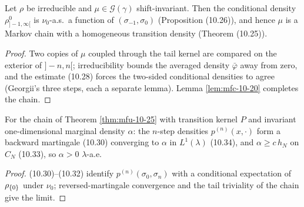 \begin{theorem}[Georgii (10.25)--(10.26)]
    \label{thm:mfu-10-25}
    \leanok

    Let $\rho$ be irreducible and $\mu \in \mathcal G(\gamma)$ shift-invariant. Then the
    conditional density $\rho^0_{]-1,\infty[}$ is $\nu_0$-a.s.\ a function of
    $(\sigma_{-1}, \sigma_0)$ (Proposition (10.26)), and hence $\mu$ is a Markov chain with a
    homogeneous transition density (Theorem (10.25)).
\end{theorem}
\begin{proof}
    \leanok
    Two copies of $\mu$ coupled through the tail kernel are compared on the exterior of
    $]-n, n[$; irreducibility bounds the averaged density $\bar\varphi$ away from zero, and the
    estimate (10.28) forces the two-sided conditional densities to agree (Georgii's three steps,
    each a separate lemma). Lemma \ref{lem:mfc-10-20} completes the chain.
\end{proof}

\begin{theorem}[Georgii (10.30)--(10.34)]
    \label{thm:mfu-10-34}
    \leanok

    For the chain of Theorem \ref{thm:mfu-10-25} with transition kernel $P$ and invariant
    one-dimensional marginal density $\alpha$: the $n$-step densities $p^{(n)}(x, \cdot)$ form a
    backward martingale (10.30) converging to $\alpha$ in $L^1(\lambda)$ (10.34), and
    $\alpha \geq c\, h_N$ on $C_N$ (10.33), so $\alpha > 0$ $\lambda$-a.e.
\end{theorem}
\begin{proof}
    \leanok
    (10.30)–(10.32) identify $p^{(n)}(\sigma_0, \sigma_n)$ with a conditional expectation of
    $\rho_{\left\{ 0 \right\}}$ under $\nu_0$; reversed-martingale convergence and the tail triviality of the
    chain give the limit.
\end{proof}

